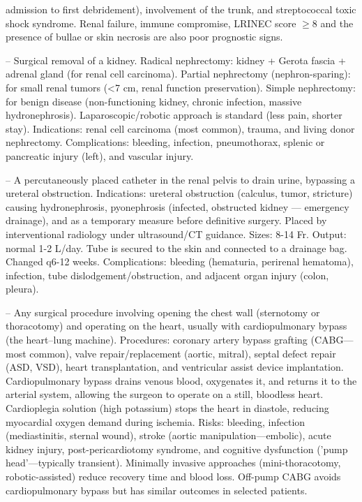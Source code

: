 admission to first debridement), involvement of the trunk, and streptococcal toxic shock syndrome. Renal failure, immune compromise, LRINEC score \(\ge\)8 and the presence of bullae or skin necrosis are also poor prognostic signs.

-- Surgical removal of a kidney. Radical nephrectomy: kidney + Gerota fascia + adrenal gland (for renal cell carcinoma). Partial nephrectomy (nephron-sparing): for small renal tumors (<7 cm, renal function preservation). Simple nephrectomy: for benign disease (non-functioning kidney, chronic infection, massive hydronephrosis). Laparoscopic/robotic approach is standard (less pain, shorter stay). Indications: renal cell carcinoma (most common), trauma, and living donor nephrectomy. Complications: bleeding, infection, pneumothorax, splenic or pancreatic injury (left), and vascular injury.

-- A percutaneously placed catheter in the renal pelvis to drain urine, bypassing a ureteral obstruction. Indications: ureteral obstruction (calculus, tumor, stricture) causing hydronephrosis, pyonephrosis (infected, obstructed kidney — emergency drainage), and as a temporary measure before definitive surgery. Placed by interventional radiology under ultrasound/CT guidance. Sizes: 8-14 Fr. Output: normal 1-2 L/day. Tube is secured to the skin and connected to a drainage bag. Changed q6-12 weeks. Complications: bleeding (hematuria, perirenal hematoma), infection, tube dislodgement/obstruction, and adjacent organ injury (colon, pleura).

-- Any surgical procedure involving opening the chest wall (sternotomy or thoracotomy) and operating on the heart, usually with cardiopulmonary bypass (the heart--lung machine). Procedures: coronary artery bypass grafting (CABG—most common), valve repair/replacement (aortic, mitral), septal defect repair (ASD, VSD), heart transplantation, and ventricular assist device implantation. Cardiopulmonary bypass drains venous blood, oxygenates it, and returns it to the arterial system, allowing the surgeon to operate on a still, bloodless heart. Cardioplegia solution (high potassium) stops the heart in diastole, reducing myocardial oxygen demand during ischemia. Risks: bleeding, infection (mediastinitis, sternal wound), stroke (aortic manipulation—embolic), acute kidney injury, post-pericardiotomy syndrome, and cognitive dysfunction ('pump head'—typically transient). Minimally invasive approaches (mini-thoracotomy, robotic-assisted) reduce recovery time and blood loss. Off-pump CABG avoids cardiopulmonary bypass but has similar outcomes in selected patients.

